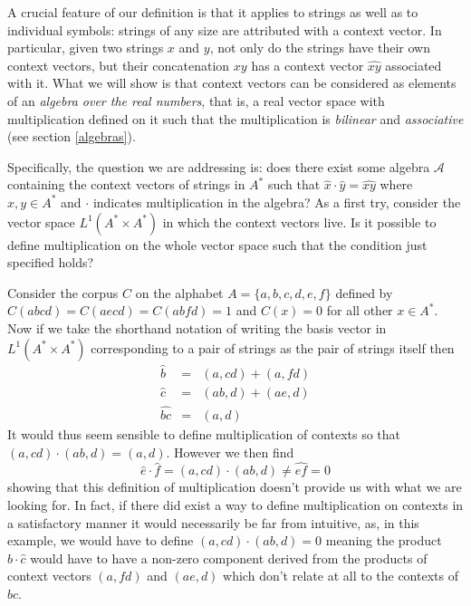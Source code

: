 A crucial feature of our definition is that it applies to strings as well as to individual symbols: strings of any size are attributed with a context vector. In particular, given two strings $x$ and $y$, not only do the strings have their own context vectors, but their concatenation $xy$ has a context vector $\widehat{xy}$ associated with it.  What we will show is that context vectors can be considered as elements of an \emph{algebra over the real numbers}, that is, a real vector space with multiplication defined on it such that the multiplication is \emph{bilinear} and \emph{associative} (see section \ref{algebras}).

Specifically, the question we are addressing is: does there exist some algebra $\mathcal{A}$ containing the context vectors of strings in $A^*$ such that $\hat{x}\cdot \hat{y} = \widehat{xy}$ where $x,y\in A^*$ and $\cdot$ indicates multiplication in the algebra? As a first try, consider the vector space $L^1(A^*\times A^*)$ in which the context vectors live. Is it possible to define multiplication on the whole vector space such that the condition just specified holds?

Consider the corpus $C$ on the alphabet $A = \{a,b,c,d,e,f\}$ defined by $C(abcd) = C(aecd) = C(abfd) = 1$ and $C(x) = 0$ for all other $x \in A^*$. Now if we take the shorthand notation of writing the basis vector in $L^1(A^*\times A^*)$ corresponding to a pair of strings as the pair of strings itself then
\begin{eqnarray*}
\hat{b} &=& (a,cd) + (a,fd)\\
\hat{c} &=& (ab,d) + (ae,d)\\
\widehat{bc} &=& (a,d)
\end{eqnarray*}
%
%
It would thus seem sensible to define multiplication of contexts so that $(a,cd)\cdot (ab,d) = (a,d)$. However we then find
$$\hat{e}\cdot \hat{f} = (a,cd)\cdot (ab,d) \neq \widehat{ef} = 0$$
showing that this definition of multiplication doesn't provide us with what we are looking for. In fact, if there did exist a way to define multiplication on contexts in a satisfactory manner it would necessarily be far from intuitive, as, in this example, we would have to define $(a,cd)\cdot (ab,d) = 0$ meaning the product $\hat{b}\cdot\hat{c}$ would have to have a non-zero component derived from the products of context vectors $(a,fd)$ and $(ae,d)$ which don't relate at all to the contexts of $bc$.


